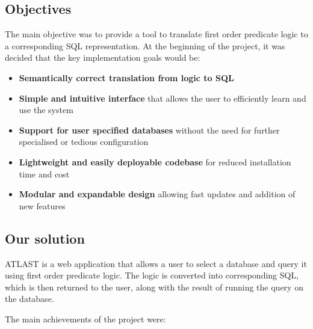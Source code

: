 \documentclass[a4paper, 11pt]{article}
\begin{document}
  \subsection{Objectives}
    The main objective was to provide a tool to translate first order predicate
    logic to a corresponding SQL representation. At the beginning of the
    project, it was decided that the key implementation goals would be:

    \begin{itemize}
      \item \textbf{Semantically correct translation from logic to SQL}

      \item \textbf{Simple and intuitive interface} that allows the user to
      efficiently learn and use the system

      \item \textbf{Support for user specified databases} without the need for
      further specialised or tedious configuration

      \item \textbf{Lightweight and easily deployable codebase} for reduced
      installation time and cost

      \item \textbf{Modular and expandable design} allowing fast updates and
      addition of new features
    \end{itemize}

  \subsection{Our solution}
    ATLAST is a web application that allows a user to select a database
    and query it using first order predicate logic. The logic is converted
    into corresponding SQL, which is then returned to the user, along with the
    result of running the query on the database.  
    
    The main achievements of the project were:
\end{document}
